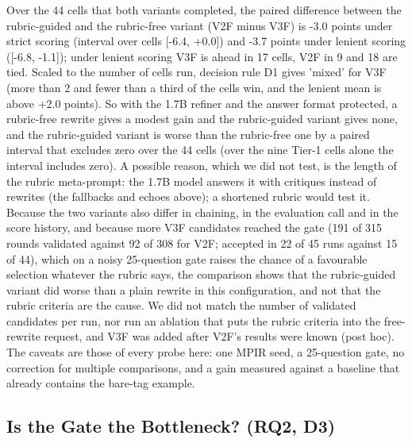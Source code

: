 \documentclass{ieeeaccess}
\begin{document}
Over the 44 cells that both variants completed, the paired difference between the rubric-guided and the rubric-free variant (V2F minus V3F) is -3.0 points under strict scoring (interval over cells [-6.4, +0.0]) and -3.7 points under lenient scoring ([-6.8, -1.1]); under lenient scoring V3F is ahead in 17 cells, V2F in 9 and 18 are tied. Scaled to the number of cells run, decision rule D1 gives 'mixed' for V3F (more than 2 and fewer than a third of the cells win, and the lenient mean is above +2.0 points). So with the 1.7B refiner and the answer format protected, a rubric-free rewrite gives a modest gain and the rubric-guided variant gives none, and the rubric-guided variant is worse than the rubric-free one by a paired interval that excludes zero over the 44 cells (over the nine Tier-1 cells alone the interval includes zero). A possible reason, which we did not test, is the length of the rubric meta-prompt: the 1.7B model answers it with critiques instead of rewrites (the fallbacks and echoes above); a shortened rubric would test it. Because the two variants also differ in chaining, in the evaluation call and in the score history, and because more V3F candidates reached the gate (191 of 315 rounds validated against 92 of 308 for V2F; accepted in 22 of 45 runs against 15 of 44), which on a noisy 25-question gate raises the chance of a favourable selection whatever the rubric says, the comparison shows that the rubric-guided variant did worse than a plain rewrite in this configuration, and not that the rubric criteria are the cause. We did not match the number of validated candidates per run, nor run an ablation that puts the rubric criteria into the free-rewrite request, and V3F was added after V2F's results were known (post hoc). The caveats are those of every probe here: one MPIR seed, a 25-question gate, no correction for multiple comparisons, and a gain measured against a baseline that already contains the bare-tag example.

\subsection{Is the Gate the Bottleneck? (RQ2, D3)}
\end{document}
